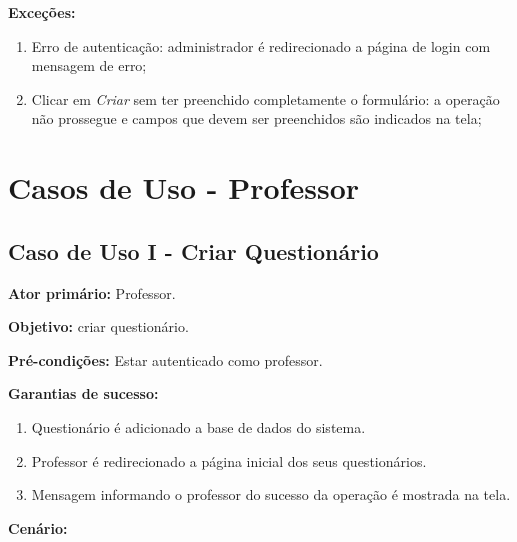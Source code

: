 \documentclass[
  12pt,       %
  openright,      %
  oneside,      %
  a4paper,      %
  english,      %
  french,        %
  spanish,     %
  brazil        %
  ]{abntex2-decsi}
\begin{document}
\begin{apendicesenv}
		\textbf{Exceções:}
		
			\begin{enumerate}	
				\item Erro de autenticação: administrador é redirecionado a página de login com mensagem de erro;
				\item Clicar em \textit{Criar} sem ter preenchido completamente o formulário: a operação não prossegue e campos que devem ser preenchidos são indicados na tela;
			\end{enumerate}  
	
    \newpage

\chapter{Casos de Uso - Professor}

\section{Caso de Uso I - Criar Questionário}
    
      \textbf{Ator primário:} Professor.

      \textbf{Objetivo:} criar questionário.

      \textbf{Pré-condições:} Estar autenticado como professor.

      \textbf{Garantias de sucesso:} 

              \begin{enumerate}

              \item Questionário é adicionado a base de dados do sistema.  
              \item Professor é redirecionado a página inicial dos seus questionários.
              \item Mensagem informando o professor do sucesso da operação é mostrada na tela.

              \end{enumerate}

          \textbf{Cenário:}


\end{apendicesenv}
\end{document}
